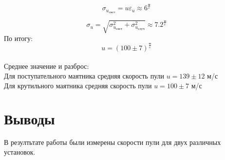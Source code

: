 \documentclass[a4paper]{article}
\begin{document}
\[\sigma_{u_{\text{сист}}} = u \varepsilon_u \approx 6^{\frac{\text{м}}{\text{с}}}\]

\[\sigma_u = \sqrt{\sigma_{u_{\text{сист}}}^2 + \sigma_{u_{\text{случ}}}^2} \approx 7.2^{\frac{\text{м}}{\text{с}}}\]
По итогу:
\[u = (100 \pm 7)^{\frac{\text{м}}{\text{с}}}\] \\
Среднее значение и разброс: \\
Для поступательного маятника средняя скорость пули $u=139\pm 12$ м/с \\
Для крутильного маятника средняя скорость пули $u=100\pm 7$ м/с

\section{Выводы}
В резултьтате работы были измерены скорости пули для двух различных установок.
\end{document}
